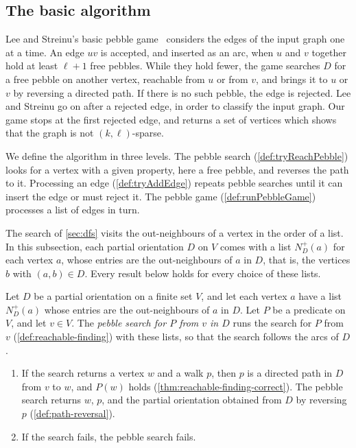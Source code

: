 \subsection{The basic algorithm}
\label{sec:pebble-game-algorithm}

Lee and Streinu's basic pebble game~\cite[\S 3, Fig.~4]{leeStreinu2008}
considers the edges of the input graph one at a time. An edge $uv$ is
accepted, and inserted as an arc, when $u$ and $v$ together hold at
least $\ell + 1$ free pebbles. While they hold fewer, the game searches
$D$ for a free pebble on another vertex, reachable from $u$ or from
$v$, and brings it to $u$ or $v$ by reversing a directed path. If there
is no such pebble, the edge is rejected. Lee and Streinu go on after a
rejected edge, in order to classify the input graph. Our game stops at
the first rejected edge, and returns a set of vertices which shows that
the graph is not $(k, \ell)$-sparse.

We define the algorithm in three levels. The pebble search
(\cref{def:tryReachPebble}) looks for a vertex with a given property,
here a free pebble, and reverses the path to it. Processing an edge (\cref{def:tryAddEdge})
repeats pebble searches until it can insert the edge or must reject it.
The pebble game (\cref{def:runPebbleGame}) processes a list of edges in
turn.

The search of \cref{sec:dfs} visits the out-neighbours of a vertex in
the order of a list. In this subsection, each partial orientation $D$
on $V$ comes with a list $N^+_D(a)$ for each vertex $a$, whose entries
are the out-neighbours of $a$ in $D$, that is, the vertices $b$ with
$(a, b) \in D$. Every result below holds for every choice of these
lists.

\begin{definition}
  \label{def:tryReachPebble}
  \leanok
  Let $D$ be a partial orientation on a finite set $V$, and let each
  vertex $a$ have a list $N^+_D(a)$ whose entries are the
  out-neighbours of $a$ in $D$. Let $P$ be a predicate on $V$, and let
  $v \in V$. The \emph{pebble search for $P$ from $v$ in $D$} runs the
  search for $P$ from $v$ (\cref{def:reachable-finding}) with these
  lists, so that the search follows the arcs of $D$.
  \begin{enumerate}
    \item If the search returns a vertex $w$ and a walk $p$, then $p$
      is a directed path in $D$ from $v$ to $w$, and $P(w)$ holds
      (\cref{thm:reachable-finding-correct}). The pebble search returns
      $w$, $p$, and the partial orientation obtained from $D$ by
      reversing $p$ (\cref{def:path-reversal}).
    \item If the search fails, the pebble search fails.
  \end{enumerate}
\end{definition}

